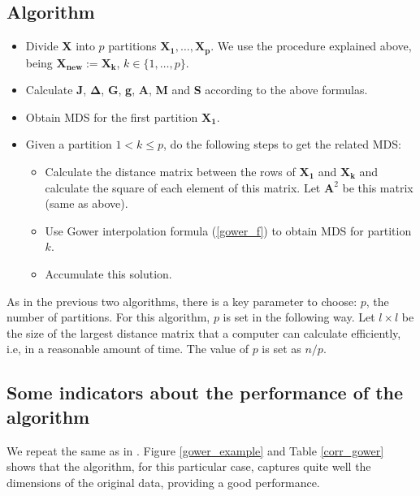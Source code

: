 \documentclass[11pt]{report}
\begin{document}
\subsection{Algorithm}

\begin{itemize}
\item Divide \textbf{X} into $p$ partitions $\mathbf{X_1},\dots, \mathbf{X_p}$.
We use the procedure explained above, being $\mathbf{X_{new}} := \mathbf{X_k}$,
$k \in \{1, \dots, p\}$.

\item Calculate \textbf{J}, $\mathbf{\Delta}$, \textbf{G}, \textbf{g},
\textbf{A}, \textbf{M} and \textbf{S} according to the above formulas.

\item Obtain MDS for the first partition $\mathbf{X_1}$. 

\item Given a partition $1 < k \leq p$, do the following steps to get the 
related MDS:

\begin{itemize}

\item Calculate the distance matrix between the rows of $\mathbf{X_1}$ and
$\mathbf{X_k}$ and calculate the square of each element of this matrix. Let
$\mathbf{A}^2$ be this matrix (same as above).

\item Use Gower interpolation formula (\ref{gower_f}) to obtain MDS for 
partition $k$. 

\item Accumulate this solution.


\end{itemize}

\end{itemize}


As in the previous two algorithms, there is a key parameter to choose: $p$,
the number of partitions. For this algorithm, $p$ is set in the following way.
Let $l \times l$ be the size of the largest distance matrix that a computer can 
calculate efficiently, i.e, in a reasonable amount of time. The value of 
$p$ is set as $n/p$.


\subsection{Some indicators about the performance of the algorithm}
We repeat the same as in . Figure \ref{gower_example} 
and Table \ref{corr_gower} shows that the algorithm, for this particular case, 
captures quite well the dimensions of the original data, providing a 
good performance.
\end{document}
